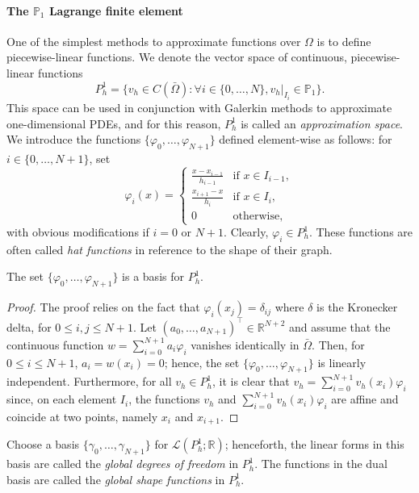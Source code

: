 \paragraph{The $\mathbb{P}_1$ Lagrange finite element}
One of the simplest methods to approximate functions over $\Omega$ is to define piecewise-linear functions. We denote the vector space of continuous, piecewise-linear functions
\begin{equation}
    P_h^1 = \{ v_h \in C(\bar{\Omega}): \forall i \in \{0, \dots, N\}, v_h|_{I_i} \in \mathbb{P}_1 \}.
\end{equation}
This space can be used in conjunction with Galerkin methods to approximate one-dimensional PDEs, and for this reason, $P_h^1$ is called an \emph{approximation space}. We introduce the functions $\{\varphi_0, \dots, \varphi_{N+1}\}$ defined element-wise as follows: for $i \in \{0, \dots, N+1\}$, set
\begin{equation}
    \varphi_i(x) = \begin{cases} \frac{x - x_{i-1}}{h_{i-1}} & \text{if } x \in I_{i-1}, \\ \frac{x_{i+1} - x}{h_i} & \text{if } x \in I_i, \\ 0 & \text{otherwise}, \end{cases}
\end{equation}
with obvious modifications if $i = 0$ or $N+1$. Clearly, $\varphi_i \in P_h^1$. These functions are often called \emph{hat functions} in reference to the shape of their graph.
\begin{lemma}\label{lemma:hatbasis}
    The set $\{\varphi_0, \dots, \varphi_{N+1}\}$ is a basis for $P_h^1$.
    \begin{proof}
        The proof relies on the fact that $\varphi_i(x_j) = \delta_{ij}$ where $\delta$ is the Kronecker delta, for $0 \le i,j \le N+1$. Let $(a_0, \dots, a_{N+1})^\top \in \mathbb{R}^{N+2}$ and assume that the continuous function $w = \sum_{i=0}^{N+1} a_i \varphi_i$ vanishes identically in $\bar{\Omega}$. Then, for $0 \le i \le N+1$, $a_i = w(x_i) = 0$; hence, the set $\{\varphi_0, \dots, \varphi_{N+1}\}$ is linearly independent. Furthermore, for all $v_h \in P_h^1$, it is clear that $v_h = \sum_{i=0}^{N+1} v_h(x_i) \varphi_i$ since, on each element $I_i$, the functions $v_h$ and $\sum_{i=0}^{N+1} v_h(x_i) \varphi_i$ are affine and coincide at two points, namely $x_i$ and $x_{i+1}$.
    \end{proof}
\end{lemma}
\begin{definition}\label{def:global-shape-functions}
    Choose a basis $\{\gamma_0, \dots, \gamma_{N+1}\}$ for $\mathcal{L}(P_h^1;\mathbb{R})$; henceforth, the linear forms in this basis are called the \emph{global degrees of freedom} in $P_h^1$. The functions in the dual basis are called the \emph{global shape functions} in $P_h^1$. 
\end{definition}


